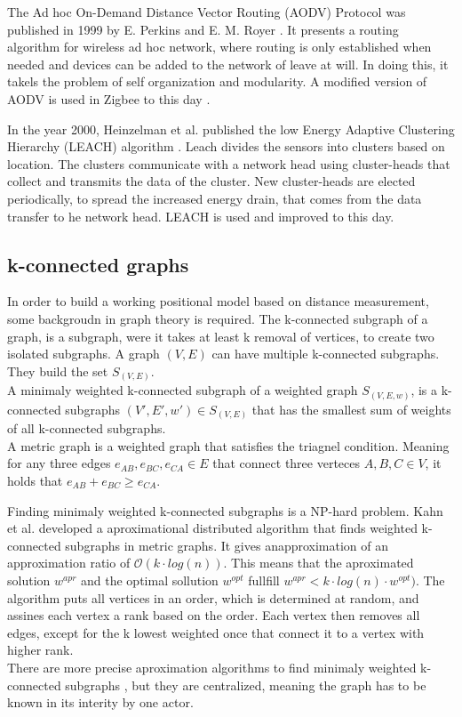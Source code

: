 The Ad hoc On-Demand Distance Vector Routing (AODV) Protocol was published in 1999 by E. Perkins and E. M. Royer \cite{royer1999multicast}.
It presents a routing algorithm for wireless ad hoc network, where routing is only established when needed and devices can be added to the network of leave at will.
In doing this, it takels the problem of self organization and modularity.
A modified version of AODV is used in Zigbee to this day \cite{mu2017improved}. 

In the year 2000, Heinzelman et al. published the low Energy Adaptive Clustering Hierarchy (LEACH) algorithm \cite{heinzelman2000energy}.
Leach divides the sensors into clusters based on location.
The clusters communicate with a network head using cluster-heads that collect and transmits the data of the cluster.
New cluster-heads are elected periodically, to spread the increased energy drain, that comes from the data transfer to he network head.
LEACH is used \cite{sefati2022cluster, ghazy2023low} and improved \cite{bagherzadeh2022survey} to this day.

\subsection{k-connected graphs}
\label{ss:k_connected_explained}
In order to build a working positional model based on distance measurement, some backgroudn in graph theory is required.
The k-connected subgraph of a graph, is a subgraph, were it takes at least k removal of vertices, to create two isolated subgraphs.
A graph $(V,E)$ can have multiple k-connected subgraphs.
They build the set $S_{(V,E)}$.\\
A minimaly weighted k-connected subgraph of a weighted graph $S_{(V,E,w)}$, is a k-connected subgraphs $(V',E',w') \in S_{(V,E)}$ that has the smallest sum of weights of all k-connected subgraphs.\\
A metric graph is a weighted graph that satisfies the triagnel condition.
Meaning for any three edges $e_{AB},e_{BC},e_{CA} \in E$  that connect three verteces $A, B, C \in V$, it holds that $e_{AB} + e_{BC} \geq e_{CA}$.


Finding minimaly weighted k-connected subgraphs is a NP-hard problem.
Kahn et al. \cite{khan2007simple} developed a aproximational distributed algorithm that finds weighted k-connected subgraphs in metric graphs.
It gives anapproximation of an approximation ratio of $\mathcal{O}(k\cdot log(n))$.
This means that the aproximated solution $w^{apr}$ and the optimal sollution $w^{opt}$ fullfill $w^{apr} < k\cdot log(n)\cdot w^{opt})$.
The algorithm puts all vertices in an order, which is determined at random, and assines each vertex a rank based on the order.
Each vertex then removes all edges, except for the k lowest weighted once that connect it to a vertex with higher rank.\\
There are more precise aproximation algorithms to find minimaly weighted k-connected subgraphs \cite{kortsarz2003approximating, kortsarz2004approximation}, but they are centralized, meaning the graph has to be known in its interity by one actor.


